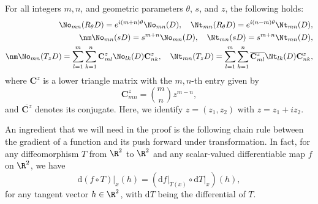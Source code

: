 \begin{proposition}
\label{prop:complex-cgpt-under}
  For all integers $m,n$, and geometric parameters $\theta$, $s$, and $z$, the following
  holds:
  \begin{align}
    \No_{mn}(R_\theta D) = e^{i(m+n)\theta}\No_{mn}(D), \quad
    \Nt_{mn}(R_\theta D) = e^{i(n-m)\theta}\Nt_{mn}(D),    \label{eq:CGPT_rot_Nt}\\
    \nm
    \No_{mn}(sD) = {s^{m+n}}\No_{mn}(D),   \quad
    \Nt_{mn}(sD) = {s^{m+n}}\Nt_{mn}(D),    \label{eq:CGPT_scl_Nt}\\
    \nm
    \No_{mn}(T_zD) = \sum_{l=1}^m \sum_{k=1}^n \mathbf{C}^z_{ml}\No_{lk}(D) \mathbf{C}^z_{nk},
    \quad
    \Nt_{mn}(T_zD) = \sum_{l=1}^m \sum_{k=1}^n \overline{\mathbf{C}^z_{ml}}\Nt_{lk}(D) \mathbf{C}^z_{nk},    \label{eq:CGPT_trans_Nt}
  \end{align}
  where $\mathbf{C}^z$ is a lower triangle matrix with the $m,n$-th entry given
  by
  \begin{equation} \label{defcz}
  \mathbf{C}^z_{mn}= \binom{m}{n}  z^{m-n},
  \end{equation}
  and $\overline{\mathbf{C}^z}$ denotes its conjugate. Here, we
  identify $z=(z_1,z_2)$ with $z= z_1 + i z_2$.
\end{proposition}

An ingredient that we will need in the proof is the following
chain rule between the gradient of a function and its push forward
under transformation.  In fact, for any diffeomorphism $T$ from
$\R^2$ to $\R^2$ and any scalar-valued differentiable map $f$ on
$\R^2$, we have
\begin{equation}
\textrm{d} (f\circ T) \big|_x (h) = \left(\textrm{d} f
\big|_{T(x)} \circ \textrm{d}T\big|_x \right) (h),
\label{eq:chainrule}
\end{equation}
for any tangent vector $h \in \R^2$, with $\textrm{d}T$ being the
differential of $T$.

